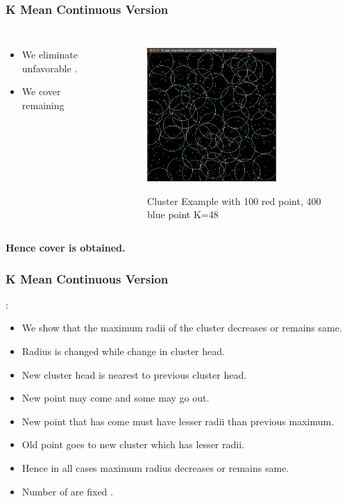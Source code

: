 \documentclass[blue]{beamer}
\begin{document}
\begin{frame}
 \frametitle{K Mean Continuous Version}
 \begin{columns}
 \begin{itemize}
  \item We eliminate unfavorable {\color{blue}{blue points}}.
  \item We cover remaining {\color{red}{red points}} 
 
 \end{itemize}
 \begin{figure}[H]
     \caption{Cluster Example with 100 red point, 400 blue point K=48 }
        \centering
           \scalebox{0.9}
          {\includegraphics[width=\linewidth ,height =2.0in]{cover28a.png}}
     \end{figure}
 \end{columns}
 {\color{red}\textbf{{Hence cover is obtained.}}}
\end{frame}


 
\begin{frame}
 \frametitle{K Mean Continuous Version}
 {}: {\color{blue}{Algorithm Converges in every feasible condition.}}
 \begin{itemize}
  \item We show that the maximum radii of the cluster decreases or remains same.
  \item Radius is changed while change in cluster head.
  \item New cluster head is nearest to previous cluster head.
  \item New point may come and some may go out.
  \item New point that has come must have lesser radii than previous maximum. 
  \item Old point goes to new cluster which has lesser radii.
  \item Hence in all cases maximum radius decreases or remains same.
  \item Number of {\color{red}{red points}} are fixed .
  \end{itemize}
\end{frame}
\end{document}
